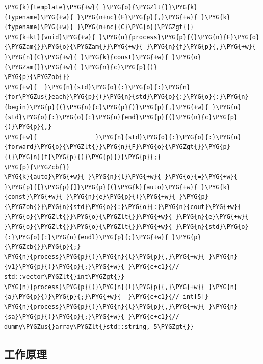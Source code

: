 \begin{itemize}

\begin{codeblockbg}
\begin{Verbatim}[commandchars=\\\{\},breaklines=true,breakanywhere=true,fontsize=\codefont,xleftmargin=17bp]
\PYG{k}{template}\PYG{+w}{ }\PYG{o}{\PYGZlt{}}\PYG{k}{typename}\PYG{+w}{ }\PYG{n+nc}{F}\PYG{p}{,}\PYG{+w}{ }\PYG{k}{typename}\PYG{+w}{ }\PYG{n+nc}{C}\PYG{o}{\PYGZgt{}}
\PYG{k+kt}{void}\PYG{+w}{ }\PYG{n}{process}\PYG{p}{(}\PYG{n}{F}\PYG{o}{\PYGZam{}}\PYG{o}{\PYGZam{}}\PYG{+w}{ }\PYG{n}{f}\PYG{p}{,}\PYG{+w}{ }\PYG{n}{C}\PYG{+w}{ }\PYG{k}{const}\PYG{+w}{ }\PYG{o}{\PYGZam{}}\PYG{+w}{ }\PYG{n}{c}\PYG{p}{)}
\PYG{p}{\PYGZob{}}
\PYG{+w}{  }\PYG{n}{std}\PYG{o}{:}\PYG{o}{:}\PYG{n}{for\PYGZus{}each}\PYG{p}{(}\PYG{n}{std}\PYG{o}{:}\PYG{o}{:}\PYG{n}{begin}\PYG{p}{(}\PYG{n}{c}\PYG{p}{)}\PYG{p}{,}\PYG{+w}{ }\PYG{n}{std}\PYG{o}{:}\PYG{o}{:}\PYG{n}{end}\PYG{p}{(}\PYG{n}{c}\PYG{p}{)}\PYG{p}{,}
\PYG{+w}{                }\PYG{n}{std}\PYG{o}{:}\PYG{o}{:}\PYG{n}{forward}\PYG{o}{\PYGZlt{}}\PYG{n}{F}\PYG{o}{\PYGZgt{}}\PYG{p}{(}\PYG{n}{f}\PYG{p}{)}\PYG{p}{)}\PYG{p}{;}
\PYG{p}{\PYGZcb{}}
\PYG{k}{auto}\PYG{+w}{ }\PYG{n}{l}\PYG{+w}{ }\PYG{o}{=}\PYG{+w}{ }\PYG{p}{[}\PYG{p}{]}\PYG{p}{(}\PYG{k}{auto}\PYG{+w}{ }\PYG{k}{const}\PYG{+w}{ }\PYG{n}{e}\PYG{p}{)}\PYG{+w}{ }\PYG{p}{\PYGZob{}}\PYG{n}{std}\PYG{o}{:}\PYG{o}{:}\PYG{n}{cout}\PYG{+w}{ }\PYG{o}{\PYGZlt{}}\PYG{o}{\PYGZlt{}}\PYG{+w}{ }\PYG{n}{e}\PYG{+w}{ }\PYG{o}{\PYGZlt{}}\PYG{o}{\PYGZlt{}}\PYG{+w}{ }\PYG{n}{std}\PYG{o}{:}\PYG{o}{:}\PYG{n}{endl}\PYG{p}{;}\PYG{+w}{ }\PYG{p}{\PYGZcb{}}\PYG{p}{;}
\PYG{n}{process}\PYG{p}{(}\PYG{n}{l}\PYG{p}{,}\PYG{+w}{ }\PYG{n}{v1}\PYG{p}{)}\PYG{p}{;}\PYG{+w}{ }\PYG{c+c1}{// std::vector\PYGZlt{}int\PYGZgt{}}
\PYG{n}{process}\PYG{p}{(}\PYG{n}{l}\PYG{p}{,}\PYG{+w}{ }\PYG{n}{a}\PYG{p}{)}\PYG{p}{;}\PYG{+w}{  }\PYG{c+c1}{// int[5]}
\PYG{n}{process}\PYG{p}{(}\PYG{n}{l}\PYG{p}{,}\PYG{+w}{ }\PYG{n}{sa}\PYG{p}{)}\PYG{p}{;}\PYG{+w}{ }\PYG{c+c1}{// dummy\PYGZus{}array\PYGZlt{}std::string, 5\PYGZgt{}}
\end{Verbatim}
\end{codeblockbg}

\end{itemize}



\subsection{工作原理}


